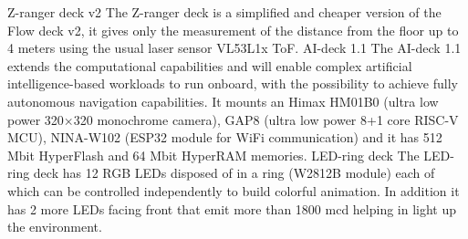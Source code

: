 Z-ranger deck v2
The Z-ranger deck is a simplified and cheaper version of the Flow deck v2, it gives only the measurement of the distance from the floor up to 4 meters using the usual laser sensor VL53L1x ToF.
AI-deck 1.1
The AI-deck 1.1 extends the computational capabilities and will enable complex artificial intelligence-based workloads to run onboard, with the possibility to achieve fully autonomous navigation capabilities. It mounts an Himax HM01B0 (ultra low power 320×320 monochrome camera), GAP8 (ultra low power 8+1 core RISC-V MCU), NINA-W102 (ESP32 module for WiFi communication) and it has 512 Mbit HyperFlash and 64 Mbit HyperRAM memories. 
LED-ring deck
The LED-ring deck has 12 RGB LEDs disposed of in a ring (W2812B module) each of which can be controlled independently to build colorful animation. In addition it has 2 more LEDs facing front that emit more than 1800 mcd helping in light up the environment.


